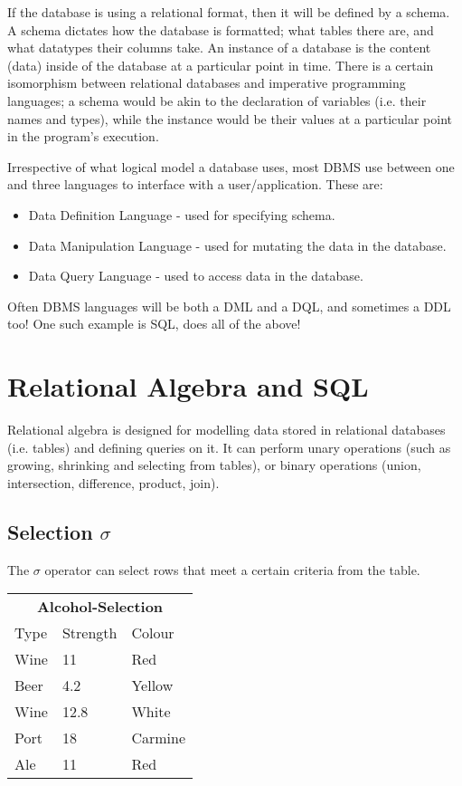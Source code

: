 If the database is using a relational format, then it will be defined by a
schema. A schema dictates how the database is formatted; what tables there are,
and what datatypes their columns take. An instance of a database is the content
(data) inside of the database at a particular point in time. There is a certain
isomorphism between relational databases and imperative programming languages; a
schema would be akin to the declaration of variables (i.e. their names and
types), while the instance would be their values at a particular point in the
program's execution.

Irrespective of what logical model a database uses, most DBMS use between one
and three languages to interface with a user/application. These are:

\begin{itemize}
  \item Data Definition Language - used for specifying schema.
  \item Data Manipulation Language - used for mutating the data in the database.
  \item Data Query Language - used to access data in the database.
\end{itemize}

Often DBMS languages will be both a DML and a DQL, and sometimes a DDL too! One
such example is SQL, does all of the above!

\section{Relational Algebra and SQL}

Relational algebra is designed for modelling data stored in relational databases
(i.e. tables) and defining queries on it. It can perform unary operations (such
as growing, shrinking and selecting from tables), or binary operations (union,
intersection, difference, product, join).

\subsection{Selection $\sigma$}

The $\sigma$ operator can select rows that meet a certain criteria from the
table.

\begin{center}
  \begin{tabular}{lll}
    \multicolumn{3}{c}{\textbf{Alcohol-Selection}}\\
    {Type} & {Strength} & {Colour}\\ \hline
    Wine          & 11                & Red\\
    Beer          & 4.2               & Yellow\\
    Wine          & 12.8              & White\\
    Port          & 18                & Carmine\\
    Ale           & 11                & Red\\
  \end{tabular}
\end{center}

